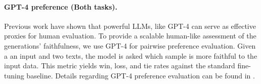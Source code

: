 \paragraph{GPT-4 preference (Both tasks).} Previous work  \citep{gpt-gilardi,gpt-chiang} have shown that powerful LLMs, like GPT-4 can serve as effective proxies for human evaluation. To provide a scalable human-like assessment of the generations' faithfulness, we use GPT-4 for pairwise preference evaluation. Given a an input and two texts, the model is asked which sample is more faithful to the input data.  This metric yields win, loss, and tie rates against the standard fine-tuning baseline. Details regarding GPT-4 preference evaluation can be found in .




